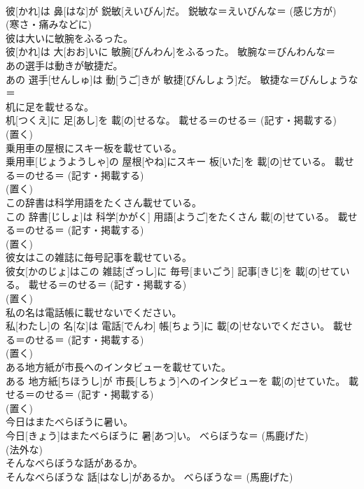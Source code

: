 \documentclass[8pt]{extreport}
\begin{document}
\begin{CJK}{UTF8}{min}
{\\	彼[かれ]は 鼻[はな]が 鋭敏[えいびん]だ。	鋭敏な＝えいびんな＝ (感じ方が) 
\\	(寒さ・痛みなどに) 
\\	彼は大いに敏腕をふるった。	
\\	彼[かれ]は 大[おお]いに 敏腕[びんわん]をふるった。	敏腕な＝びんわんな＝ 
\\	あの選手は動きが敏捷だ。	
\\	あの 選手[せんしゅ]は 動[うご]きが 敏捷[びんしょう]だ。	敏捷な＝びんしょうな＝ 
\\	机に足を載せるな。	
\\	机[つくえ]に 足[あし]を 載[の]せるな。	載せる＝のせる＝ (記す・掲載する) 
\\	(置く) 
\\	乗用車の屋根にスキー板を載せている。	
\\	乗用車[じょうようしゃ]の 屋根[やね]にスキー 板[いた]を 載[の]せている。	載せる＝のせる＝ (記す・掲載する) 
\\	(置く) 
\\	この辞書は科学用語をたくさん載せている。	
\\	この 辞書[じしょ]は 科学[かがく] 用語[ようご]をたくさん 載[の]せている。	載せる＝のせる＝ (記す・掲載する) 
\\	(置く) 
\\	彼女はこの雑誌に毎号記事を載せている。	
\\	彼女[かのじょ]はこの 雑誌[ざっし]に 毎号[まいごう] 記事[きじ]を 載[の]せている。	載せる＝のせる＝ (記す・掲載する) 
\\	(置く) 
\\	私の名は電話帳に載せないでください。	
\\	私[わたし]の 名[な]は 電話[でんわ] 帳[ちょう]に 載[の]せないでください。	載せる＝のせる＝ (記す・掲載する) 
\\	(置く) 
\\	ある地方紙が市長へのインタビューを載せていた。	
\\	ある 地方紙[ちほうし]が 市長[しちょう]へのインタビューを 載[の]せていた。	載せる＝のせる＝ (記す・掲載する) 
\\	(置く) 
\\	今日はまたべらぼうに暑い。	
\\	今日[きょう]はまたべらぼうに 暑[あつ]い。	べらぼうな＝ (馬鹿げた) 
\\	(法外な) 
\\	そんなべらぼうな話があるか。	
\\	そんなべらぼうな 話[はなし]があるか。	べらぼうな＝ (馬鹿げた) 
}
\end{CJK}
\end{document}
